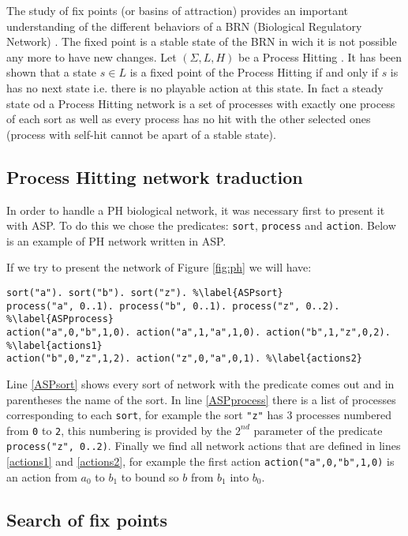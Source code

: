 The study of fix points (or basins of attraction) provides an important understanding of the different behaviors of a BRN (Biological Regulatory Network) \cite{wuensche1998genomic}.  
The fixed point is a stable state of the BRN in wich it is not possible any more to have new changes.
Let $(\Sigma, L, H)$ be a Process Hitting .
 It has been shown that a state $s \in L$ is a fixed point of the Process Hitting if and only if $s$ is has no next state \cite{PMR10-TCSB} i.e. there is no playable action at this state. In fact a steady state od a Process Hitting network is a set of processes with exactly one process of each sort as well as every process has no hit with the other selected ones (process with self-hit cannot be apart of a stable state).

\subsection{Process Hitting network traduction }
In order to handle a PH biological network, it was necessary first to present it with ASP. To do this we chose the predicates: \texttt{sort}, \texttt{process} and \texttt{action}. Below is an example of PH network written in ASP.

\begin{example*} 
If we try to present the network of Figure \ref{fig:ph} we will have:
\begin{lstlisting}
sort("a"). sort("b"). sort("z"). %\label{ASPsort}
process("a", 0..1). process("b", 0..1). process("z", 0..2). %\label{ASPprocess}
action("a",0,"b",1,0). action("a",1,"a",1,0). action("b",1,"z",0,2). %\label{actions1}
action("b",0,"z",1,2). action("z",0,"a",0,1). %\label{actions2}
\end{lstlisting}
Line \ref{ASPsort} shows every sort of network with the predicate comes out and in parentheses the name of the sort. In line \ref{ASPprocess} there is a list of processes corresponding to each \texttt{sort}, for example the sort \texttt{"z"} has 3 processes numbered from \texttt{0} to \texttt{2}, this numbering is provided by the $2^{nd}$ parameter of the predicate \texttt{process("z", 0..2)}. Finally we find all network actions that are defined in lines \ref{actions1} and \ref{actions2}, for example the first action \texttt{action("a",0,"b",1,0)} is an action from $a_0$ to $b_1$ to bound so $b$ from $b_1$ into $b_0$.
\end{example*}

\subsection{Search of fix points }

